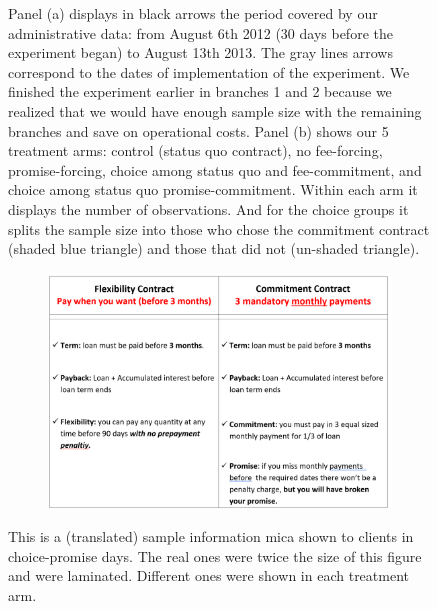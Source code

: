\documentclass[oneside,11pt]{article}
\begin{document}
\begin{figure}[H]
         \scriptsize Panel (a) displays in black arrows the period covered by our administrative data: from August 6th 2012 (30 days before the experiment began) to August 13th 2013. The gray lines arrows correspond to the dates of implementation of the experiment. We finished the experiment earlier in branches 1 and 2 because we realized that we would have enough sample size with the remaining branches and save on operational costs. Panel (b) shows our 5 treatment arms: control (status quo contract), no fee-forcing, promise-forcing, choice among status quo and fee-commitment, and choice among status quo promise-commitment. Within each arm it displays the number of observations. And  for the choice groups it splits the sample size into those who chose the commitment contract (shaded blue triangle) and those that did not (un-shaded triangle).
\end{figure}



\begin{figure}[H]
     \caption{Explanatory Material: Promise-Choice Days}
    \label{ExplanatoryMaterial}
    \begin{center}
    \begin{subfigure}{0.8\textwidth}
        \centering
        \includegraphics[width=\textwidth]{Figuras/MicaChoiceDonde.png}
    \end{subfigure}
    \end{center}
    \scriptsize
        This is a (translated) sample information mica shown to clients in choice-promise days. The real ones were twice the size of this figure and were laminated. Different ones were shown in each treatment arm.
\end{figure}
\end{document}
